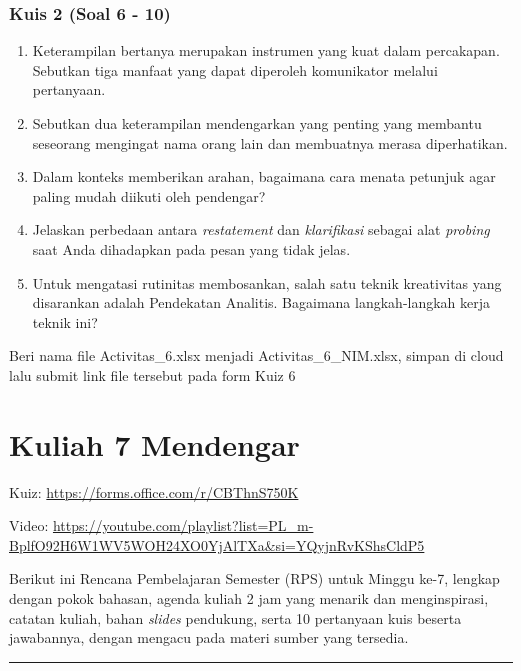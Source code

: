 \documentclass[
  letterpaper,
  DIV=11,
  numbers=noendperiod]{scrreprt}
\providecommand{\tightlist}{%
  \setlength{\itemsep}{0pt}\setlength{\parskip}{0pt}}
\begin{document}
\subsection{Kuis 2 (Soal 6 - 10)}\label{kuis-2-soal-6---10}

\begin{enumerate}
\def\labelenumi{\arabic{enumi}.}
\setcounter{enumi}{5}
\tightlist
\item
  Keterampilan bertanya merupakan instrumen yang kuat dalam percakapan.
  Sebutkan tiga manfaat yang dapat diperoleh komunikator melalui
  pertanyaan.
\item
  Sebutkan dua keterampilan mendengarkan yang penting yang membantu
  seseorang mengingat nama orang lain dan membuatnya merasa
  diperhatikan.
\item
  Dalam konteks memberikan arahan, bagaimana cara menata petunjuk agar
  paling mudah diikuti oleh pendengar?
\item
  Jelaskan perbedaan antara \emph{restatement} dan \emph{klarifikasi}
  sebagai alat \emph{probing} saat Anda dihadapkan pada pesan yang tidak
  jelas.
\item
  Untuk mengatasi rutinitas membosankan, salah satu teknik kreativitas
  yang disarankan adalah Pendekatan Analitis. Bagaimana langkah-langkah
  kerja teknik ini?
\end{enumerate}

Beri nama file Activitas\_6.xlsx menjadi Activitas\_6\_NIM.xlsx, simpan
di cloud lalu submit link file tersebut pada form Kuiz 6


\chapter{Kuliah 7 Mendengar}\label{kuliah-7-mendengar}

Kuiz: \url{https://forms.office.com/r/CBThnS750K}

Video:
\url{https://youtube.com/playlist?list=PL_m-BplfO92H6W1WV5WOH24XO0YjAlTXa&si=YQyjnRvKShsCldP5}

Berikut ini Rencana Pembelajaran Semester (RPS) untuk Minggu ke-7,
lengkap dengan pokok bahasan, agenda kuliah 2 jam yang menarik dan
menginspirasi, catatan kuliah, bahan \emph{slides} pendukung, serta 10
pertanyaan kuis beserta jawabannya, dengan mengacu pada materi sumber
yang tersedia.

\begin{center}\rule{0.5\linewidth}{0.5pt}\end{center}
\end{document}
